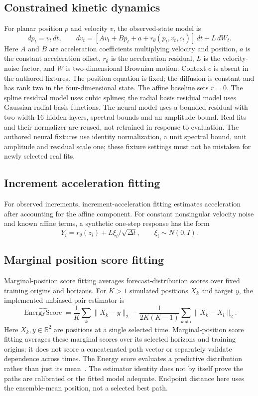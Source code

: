 \documentclass[11pt]{article}
\newcommand{\R}{\mathbb R}
\begin{document}
\subsection{Constrained kinetic dynamics}
For planar position $p$ and velocity $v$, the observed-state model is
\begin{equation}\label{eq:model}
 dp_t=v_t\,dt,\qquad
 dv_t=[A v_t+B p_t+a+r_\theta(p_t,v_t,c_t)]\,dt+L\,dW_t.
\end{equation}
Here $A$ and $B$ are acceleration coefficients multiplying velocity and position, $a$ is the constant acceleration offset, $r_\theta$ is the acceleration residual, $L$ is the velocity-noise factor, and $W$ is two-dimensional Brownian motion. Context $c$ is absent in the authored fixtures. The position equation is fixed; the diffusion is constant and has rank two in the four-dimensional state. The affine baseline sets $r=0$. The spline residual model uses cubic splines; the radial basis residual model uses Gaussian radial basis functions. The neural model uses a bounded residual with two width-16 hidden layers, spectral bounds and an amplitude bound. Real fits and their normalizer are reused, not retrained in response to evaluation. The authored neural fixtures use identity normalization, a unit spectral bound, unit amplitude and residual scale one; these fixture settings must not be mistaken for newly selected real fits.

\subsection{Increment acceleration fitting}
For observed increments, increment-acceleration fitting estimates acceleration after accounting for the affine component. For constant nonsingular velocity noise and known affine terms, a synthetic one-step response has the form
\begin{equation}\label{eq:noise}
 Y_i=r_\theta(z_i)+L\xi_i/\sqrt{\Delta t},\qquad \xi_i\sim N(0,I).
\end{equation}

\subsection{Marginal position score fitting}
Marginal-position score fitting averages forecast-distribution scores over fixed training origins and horizons. For $K>1$ simulated positions $X_k$ and target $y$, the implemented unbiased pair estimator is
\begin{equation}\label{eq:energy}
 \widehat{\operatorname{EnergyScore}}=\frac1K\sum_k\|X_k-y\|_2
 -\frac{1}{2K(K-1)}\sum_{k\ne l}\|X_k-X_l\|_2.
\end{equation}
Here $X_k,y\in\R^2$ are positions at a single selected time. Marginal-position score fitting averages these marginal scores over its selected horizons and training origins; it does not score a concatenated path vector or separately validate dependence across times. The Energy score evaluates a predictive distribution rather than just its mean~\cite{gneiting2007}. The estimator identity does not by itself prove the paths are calibrated or the fitted model adequate. Endpoint distance here uses the ensemble-mean position, not a selected best path.
\end{document}

